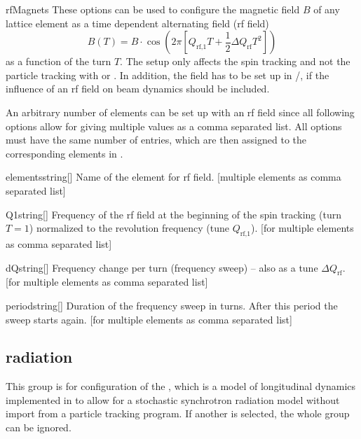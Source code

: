 \documentclass[a4paper]{scrartcl}
\begin{document}
\clearpage
\begin{configdocgroup}{rfMagnets}
  These options can be used to configure the magnetic field $B$ of any lattice element as a
  time dependent alternating field (rf field)
  \begin{equation*}
    B(T) = B \cdot \cos\left( 2\pi \left[ Q_\text{rf,1}T + \frac{1}{2}\Delta
        Q_\text{rf} T^2 \right] \right)
  \end{equation*}
  as a function of the turn $T$.
  The setup only affects the spin tracking and not the particle tracking with \ele or
  \madx. In addition, the field has to be set up in \ele/\madx, if the influence of an rf
  field on beam dynamics should be included.

  An arbitrary number of elements can be set up with an rf field since all
  following options allow for giving multiple values as a comma separated list. All
  options must have the same number of entries, which are then assigned to the
  corresponding elements in .\\[1mm]

  \begin{configdoc}{elements}{string}{}[]
    Name of the element for rf field. [multiple elements as comma separated list]
  \end{configdoc}

  \begin{configdoc}{Q1}{string}{}[]
    Frequency of the rf field at the beginning of the spin tracking (turn $T=1$) normalized to
    the revolution frequency (tune $Q_\text{rf,1}$). [for multiple elements as comma separated list]
  \end{configdoc}

  \begin{configdoc}{dQ}{string}{}[]
    Frequency change per turn (frequency sweep) -- also as a tune $\Delta Q_\text{rf}$.
    [for multiple elements as comma separated list]
  \end{configdoc}

  \begin{configdoc}{period}{string}{}[]
    Duration of the frequency sweep in turns. After this period the sweep starts again.
    [for multiple elements as comma separated list]
  \end{configdoc}
\end{configdocgroup}



\subsection{radiation}
\label{sec:config-rad}
This group is for configuration of the  ,
which is a model of longitudinal dynamics implemented in \polem to allow for a stochastic
synchrotron radiation model without import from a particle tracking program. If another
 is selected, the whole group can be ignored.
\end{document}
